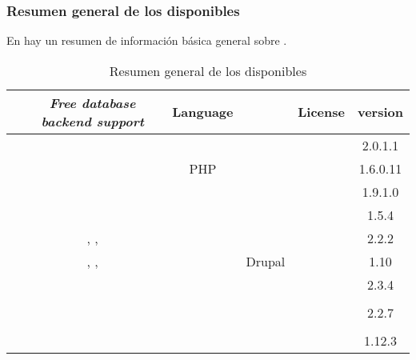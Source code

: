 \subsubsection{Resumen general de los \frameworks disponibles}

En  hay un resumen de información básica general sobre \shoppingCarts.

\begin{table}[H]
    \tiny
    \centering
\begin{tabular}{ |l|c|c|c|c|c| }

\hline
	&
	\textit{Free database backend support}&
	Language&
	\textit{\gloss{waf}}&
	License&
	version

\\ \hline
	\nameOpenCart &
	\mysql&
	\php&
	&
	\gplthreelicense &
	2.0.1.1
	
\\ \hline
	\namePrestaShop &
	\mysql&
	PHP&
	&
	\opslicense &
	1.6.0.11
	
\\ \hline
	\nameMagento &
	\mysql&
	\php&
	\nameZendFramework \cite{online_zend_framework}&
	\opslicense &
	1.9.1.0
	
\\ \hline
	\nameZenCart &
	\mysql&
	\php&
	&
	\gpllicense &
	1.5.4
 
\\ \hline
	\nameSpreeCommerce &
	\mysql, \postgresql, \sqlitethree&
	\ruby \cite{online_ruby_language}&
	\rubyonrails \cite{online_ruby_rails}&
	\bsdthreelicense&
	2.2.2

\\ \hline
	\nameDrupalCommerce &
	\mysql, \postgresql, \sqlitethree&
	\php&
	Drupal\cite{online_drupal}&
	\gpllicense &
	1.10
	
\\ \hline
	\nameOsCommerce &
	\mysql&
	\php&
	&
	\gpllicense &
	2.3.4

\\ \hline
	\nameSimpleCart &
	&
	&
	&
	&
	
\\ \hline
	\nameWooCommerce &
	\mysql&
	\php&
	\wordPress \cite{online_wordpress}&
	\gpllicense &
	2.2.7
	
\\ \hline
	\nameWPECommerce &
	&
	&
	&
	&
	
\\ \hline
	\nameJigoshop &
	\mysql&
	\php&
	\wordPress \cite{online_wordpress}&
	\gpllicense &
	1.12.3
	
\\ \hline
\end{tabular}
    \caption{ Resumen general de los \frameworks disponibles}
    \label{tab:resume_technology_ecommerce}
\end{table}

